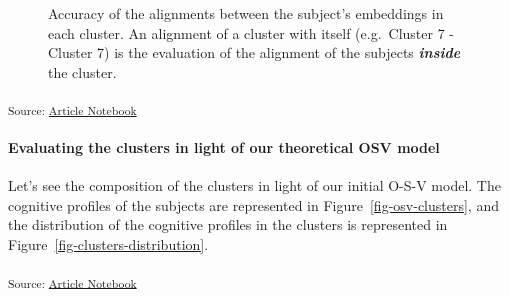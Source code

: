\documentclass[
  authoryear]{elsarticle}
\let\oldparagraph\paragraph
\renewcommand{\paragraph}[1]{\oldparagraph{#1}\mbox{}}
\begin{document}
\label{cell-fig-clusters-accuracy}
\begin{figure}[H]


\caption{\label{fig-clusters-accuracy}Accuracy of the alignments between
the subject's embeddings in each cluster. An alignment of a cluster with
itself (e.g.~Cluster 7 - Cluster 7) is the evaluation of the alignment
of the subjects \textbf{\emph{inside}} the cluster.}

\end{figure}%

\textsubscript{Source:
\href{https://m-delem.github.io/2499-similarity-manuscript/index.qmd.html}{Article
Notebook}}

\paragraph{Evaluating the clusters in light of our theoretical OSV
model}\label{evaluating-the-clusters-in-light-of-our-theoretical-osv-model}

Let's see the composition of the clusters in light of our initial O-S-V
model. The cognitive profiles of the subjects are represented in
Figure~\ref{fig-osv-clusters}, and the distribution of the cognitive
profiles in the clusters is represented in
Figure~\ref{fig-clusters-distribution}.

\textsubscript{Source:
\href{https://m-delem.github.io/2499-similarity-manuscript/index.qmd.html}{Article
Notebook}}
\end{document}

